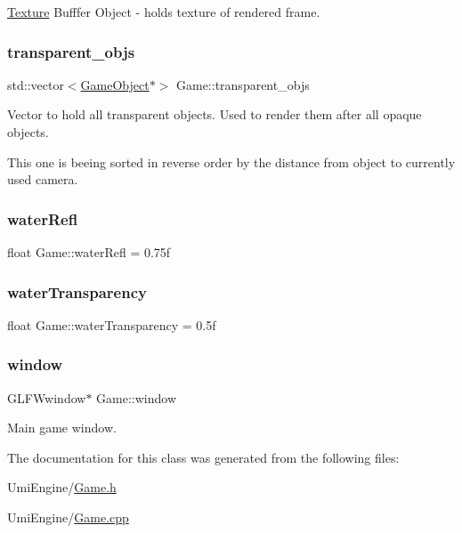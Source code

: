 \mbox{\hyperlink{class_texture}{Texture}} Bufffer Object -\/ holds texture of rendered frame. 

\mbox{\label{class_game_a29149a40296ca49ec4aacdad04716fe4}} 
\subsubsection{\texorpdfstring{transparent\_objs}{transparent\_objs}}
{\footnotesize\ttfamily std\+::vector$<$\mbox{\hyperlink{class_game_object}{Game\+Object}}$\ast$$>$ Game\+::transparent\+\_\+objs}



Vector to hold all transparent objects. Used to render them after all opaque objects. 

This one is beeing sorted in reverse order by the distance from object to currently used camera. \mbox{\label{class_game_a61286f3abaf4d831fd5a5e681058e37a}} 
\subsubsection{\texorpdfstring{waterRefl}{waterRefl}}
{\footnotesize\ttfamily float Game\+::water\+Refl = 0.\+75f}

\mbox{\label{class_game_a1d2ebf9d3a73b5e032de84a9d9aa6d53}} 
\subsubsection{\texorpdfstring{waterTransparency}{waterTransparency}}
{\footnotesize\ttfamily float Game\+::water\+Transparency = 0.\+5f}

\mbox{\label{class_game_ad9bc7cf39168a1ceaf77d6177116aa94}} 
\subsubsection{\texorpdfstring{window}{window}}
{\footnotesize\ttfamily G\+L\+F\+Wwindow$\ast$ Game\+::window\hspace{0.3cm}{\ttfamily [protected]}}



Main game window. 



The documentation for this class was generated from the following files\+:\begin{DoxyCompactItemize}
\item 
Umi\+Engine/\mbox{\hyperlink{_game_8h}{Game.\+h}}\item 
Umi\+Engine/\mbox{\hyperlink{_game_8cpp}{Game.\+cpp}}\end{DoxyCompactItemize}
